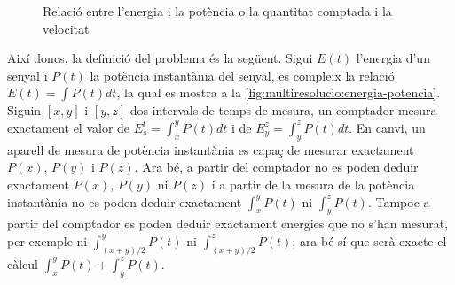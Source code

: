  



\begin{figure}[tp]
  \centering


      \caption{Relació entre l'energia i la potència o la quantitat
        comptada i la velocitat}
  \label{fig:multiresolucio:energia-potencia}
\end{figure}




Així doncs, la definició del problema és la següent.  Sigui $E(t)$
l'energia d'un senyal i $P(t)$ la potència instantània del senyal, es
compleix la relació $E(t)=\int P(t) dt$, la qual es mostra a la
\autoref{fig:multiresolucio:energia-potencia}. %
Siguin $[x,y]$ i $[y,z]$ dos intervals de temps de mesura, un
comptador mesura exactament el valor de $E_{s}^{t} =
\int_{x}^{y} P(t) dt$ i de $E_{y}^{z} =\int_{y}^{z} P(t) dt$. En canvi,
un aparell de mesura de potència instantània es capaç de mesurar
exactament $P(x)$, $P(y)$ i $P(z)$. Ara bé, a partir del
comptador no es poden deduir exactament $P(x)$, $P(y)$ ni $P(z)$
i a partir de la mesura de la potència instantània no es poden deduir
exactament $\int_{x}^{y} P(t)$ ni $\int_{y}^{z} P(t)$. Tampoc
a partir del comptador es poden deduir exactament energies que no
s'han mesurat, per exemple ni $\int_{(x+y)/2}^{y} P(t)$ ni
$\int_{(x+y)/2}^{z} P(t)$; ara bé sí que serà exacte el càlcul
$\int_{x}^{y} P(t)+\int_{y}^{z} P(t)$.
  

